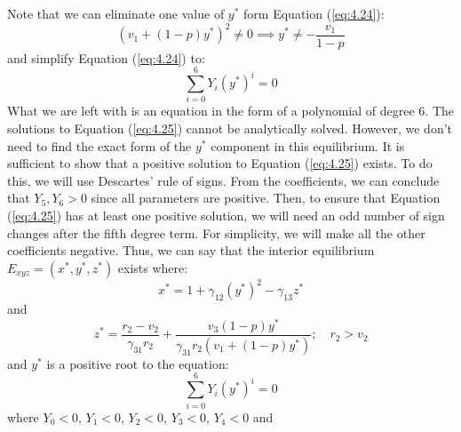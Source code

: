 Note that we can eliminate one value of $y^*$ form Equation (\ref{eq:4.24}):
\[
\left(v_1+\left(1-p\right)y^*\right)^2\neq0 \implies y^*\neq-\frac{v_1}{1-p}
\]
and simplify Equation (\ref{eq:4.24}) to:
\begin{equation}
    \sum_{i=0}^6 Y_i\left(y^*\right)^i=0
    \label{eq:4.25}
\end{equation}
What we are left with is an equation in the form of a polynomial of degree 6. The solutions to Equation (\ref{eq:4.25}) cannot be analytically solved. However, we don't need to find the exact form of the $y^*$ component in this equilibrium. It is sufficient to show that a positive solution to Equation (\ref{eq:4.25}) exists. To do this, we will use Descartes' rule of signs. From the coefficients, we can conclude that $Y_5,Y_6>0$ since all parameters are positive. Then, to ensure that Equation (\ref{eq:4.25}) has at least one positive solution, we will need an odd number of sign changes after the fifth degree term. For simplicity, we will make all the other coefficients negative. Thus, we can say that the interior equilibrium $E_{xyz}=\left(x^*,y^*,z^*\right)$ exists where:
\[
x^*=1+\gamma_{12}\left(y^*\right)^2-\gamma_{13}z^*
\]
and
\[
z^*=\frac{r_2-v_2}{\gamma_{31}r_2}+\frac{v_3\left(1-p\right)y^*}{\gamma_{31}r_2\left(v_1+\left(1-p\right)y^*\right)};\quad r_2>v_2
\]
and $y^*$ is a positive root to the equation:
\begin{equation*}
    \sum_{i=0}^6 Y_i\left(y^*\right)^i=0
\end{equation*}
where $Y_0<0$, $Y_1<0$, $Y_2<0$, $Y_3<0$, $Y_4<0$ and 
